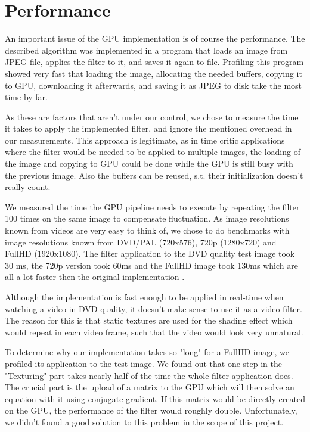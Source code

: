 \section{Performance} \label{performance}
An important issue of the GPU implementation is of course the performance.
The described algorithm was implemented in a program that loads an image
from JPEG file, applies the filter to it, and saves it again to file.
Profiling this program showed very fast that loading the image, allocating the
needed buffers, copying it to GPU, downloading it afterwards, and saving it
as JPEG to disk take the most time by far.

As these are factors that aren't under our control, we chose to measure
the time it takes to apply the implemented filter, and ignore the mentioned
overhead in our measurements. This approach is legitimate, as in time critic
applications where the filter would be needed to be applied to multiple images,
the loading of the image and copying to GPU could be done while the GPU
is still busy with the previous image. Also the buffers can be reused,
s.t. their initialization doesn't really count.

We measured the time the GPU pipeline needs to execute by repeating the
filter 100 times on the same image to compensate fluctuation. As
image resolutions known from videos are very easy to think of,
we chose to do benchmarks with image resolutions known from
DVD/PAL (720x576), 720p (1280x720) and FullHD (1920x1080). The filter
application to the DVD quality test image took 30 ms, the 720p version
took 60ms and the FullHD image took 130ms which are all a lot faster
then the original implementation \cite{mainPaper}.

Although the implementation is fast enough to be applied in real-time when watching
a video in DVD quality, it doesn't make sense to use it as a video filter.
The reason for this is that static textures are used for the shading effect
which would repeat in each video frame, such that the video would look very
unnatural.

To determine why our implementation takes so "long" for a FullHD image,
we profiled its application to the test image. We found out that one step
in the "Texturing" part takes nearly half of the time the whole filter
application does. The crucial part is the upload of a matrix to the GPU
which will then solve an equation with it using conjugate gradient. If
this matrix would be directly created on the GPU, the performance of the
filter would roughly double. Unfortunately, we didn't found a good solution
to this problem in the scope of this project.